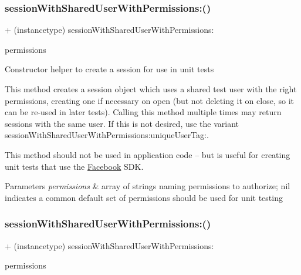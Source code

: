 \subsubsection{\texorpdfstring{session\+With\+Shared\+User\+With\+Permissions\+:()}{sessionWithSharedUserWithPermissions:()}\hspace{0.1cm}{\footnotesize\ttfamily [3/5]}}
{\footnotesize\ttfamily + (instancetype) session\+With\+Shared\+User\+With\+Permissions\+: \begin{DoxyParamCaption}\item[{(N\+S\+Array $\ast$)}]{permissions }\end{DoxyParamCaption}}

Constructor helper to create a session for use in unit tests

This method creates a session object which uses a shared test user with the right permissions, creating one if necessary on open (but not deleting it on close, so it can be re-\/used in later tests). Calling this method multiple times may return sessions with the same user. If this is not desired, use the variant session\+With\+Shared\+User\+With\+Permissions\+:unique\+User\+Tag\+:.

This method should not be used in application code -- but is useful for creating unit tests that use the \hyperlink{interfaceFacebook}{Facebook} S\+DK.


\begin{DoxyParams}{Parameters}
{\em permissions} & array of strings naming permissions to authorize; nil indicates a common default set of permissions should be used for unit testing \\
\hline
\end{DoxyParams}
\mbox{\label{interfaceFBTestSession_a27f8f36ddb23ea218117bc2e927d8039}} 
\subsubsection{\texorpdfstring{session\+With\+Shared\+User\+With\+Permissions\+:()}{sessionWithSharedUserWithPermissions:()}\hspace{0.1cm}{\footnotesize\ttfamily [4/5]}}
{\footnotesize\ttfamily + (instancetype) session\+With\+Shared\+User\+With\+Permissions\+: \begin{DoxyParamCaption}\item[{(N\+S\+Array $\ast$)}]{permissions }\end{DoxyParamCaption}}

